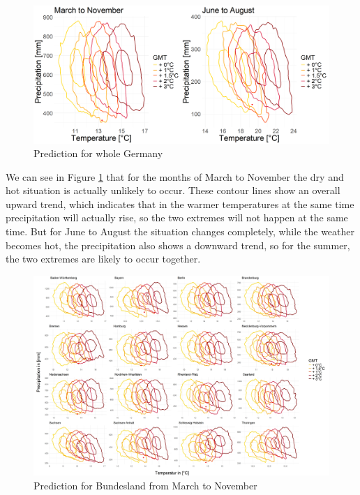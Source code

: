 \documentclass[
]{krantz}
\begin{document}
\begin{figure}

{\centering \includegraphics[width=0.8\linewidth]{work/03-compounds/figures/GMT/predictionall} 

}

\caption{Prediction for whole Germany}\label{fig:prediction1-shiyu}
\end{figure}

We can see in Figure \ref{fig:prediction1-shiyu} that for the months of March to November the dry and hot situation is actually unlikely to occur. These contour lines show an overall upward trend, which indicates that in the warmer temperatures at the same time precipitation will actually rise, so the two extremes will not happen at the same time. But for June to August the situation changes completely, while the weather becomes hot, the precipitation also shows a downward trend, so for the summer, the two extremes are likely to occur together.

\begin{figure}

{\centering \includegraphics[width=0.8\linewidth]{work/03-compounds/figures/GMT/predictbundeslandMtoN} 

}

\caption{Prediction for Bundesland from March to November}\label{fig:prediction2-shiyu}
\end{figure}
\end{document}
